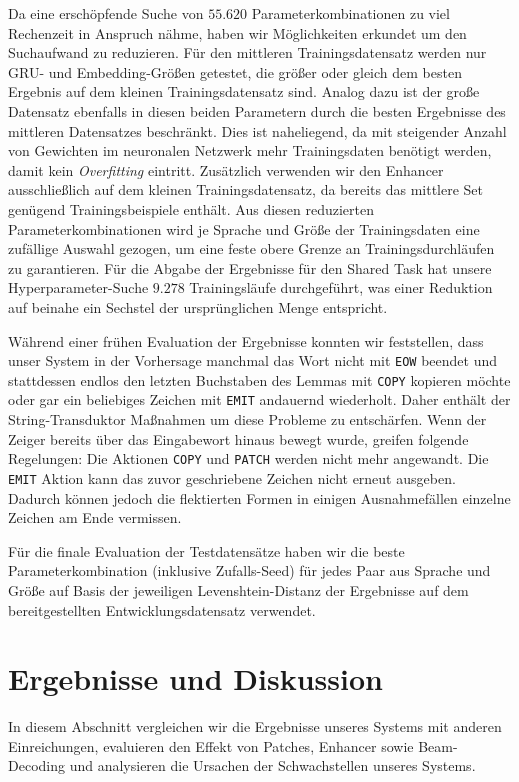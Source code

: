 \documentclass[11pt,a4paper]{article}
\newcommand{\action}[1]{\texttt{#1}}
\begin{document}
Da eine erschöpfende Suche von $55.620$ Parameterkombinationen zu viel Rechenzeit in Anspruch nähme, haben wir Möglichkeiten erkundet um den Suchaufwand zu reduzieren. Für den mittleren Trainingsdatensatz werden nur GRU- und Embedding-Größen getestet, die größer oder gleich dem besten Ergebnis auf dem kleinen Trainingsdatensatz sind.
Analog dazu ist der große Datensatz ebenfalls in diesen beiden Parametern durch die besten Ergebnisse des mittleren Datensatzes beschränkt.
Dies ist naheliegend, da mit steigender Anzahl von Gewichten im neuronalen Netzwerk mehr Trainingsdaten benötigt werden, damit kein \textit{Overfitting} eintritt.
Zusätzlich verwenden wir den Enhancer ausschließlich auf dem kleinen Trainingsdatensatz, da bereits das mittlere Set genügend Trainingsbeispiele enthält.
Aus diesen reduzierten Parameterkombinationen wird je Sprache und Größe der Trainingsdaten eine zufällige Auswahl gezogen, um eine feste obere Grenze an Trainingsdurchläufen zu garantieren.
Für die Abgabe der Ergebnisse für den Shared Task hat unsere Hyperparameter-Suche $9.278$ Trainingsläufe durchgeführt, was einer Reduktion auf beinahe ein Sechstel der ursprünglichen Menge entspricht.

Während einer frühen Evaluation der Ergebnisse konnten wir feststellen, dass unser System in der Vorhersage manchmal das Wort nicht mit \action{EOW} beendet und stattdessen endlos den letzten Buchstaben des Lemmas mit \action{COPY} kopieren möchte oder gar ein beliebiges Zeichen mit \action{EMIT} andauernd wiederholt.
Daher enthält der String-Transduktor Maßnahmen um diese Probleme zu entschärfen.
Wenn der Zeiger bereits über das Eingabewort hinaus bewegt wurde, greifen folgende Regelungen:
Die Aktionen \action{COPY} und \action{PATCH} werden nicht mehr angewandt. Die \action{EMIT} Aktion kann das zuvor geschriebene Zeichen nicht erneut ausgeben. 
Dadurch können jedoch die flektierten Formen in einigen Ausnahmefällen einzelne Zeichen am Ende vermissen. 

Für die finale Evaluation der Testdatensätze haben wir die beste Parameterkombination (inklusive Zufalls-Seed) für jedes Paar aus Sprache und Größe auf Basis der jeweiligen Levenshtein-Distanz der Ergebnisse auf dem bereitgestellten Entwicklungsdatensatz verwendet.

\section{Ergebnisse und Diskussion}
\label{sec:results}

In diesem Abschnitt vergleichen wir die Ergebnisse unseres Systems mit anderen Einreichungen, evaluieren den Effekt von Patches, Enhancer sowie Beam-Decoding und analysieren die Ursachen der Schwachstellen unseres Systems.
\end{document}
